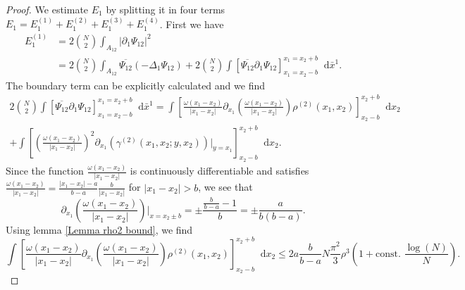 \documentclass[a4paper,11pt]{article}
\newcommand{\abs}[1]{\left\lvert #1 \right\rvert}
\newcommand*\diff{\mathop{}\!\mathrm{d}}
\numberwithin{equation}{section}
\begin{document}
		\begin{proof}
		We estimate $ E_1 $ by splitting it in four terms $ E_1=E_1^{(1)}+E_1^{(2)}+E_1^{(3)}+E_1^{(4)} $. First we have \begin{equation}
		\begin{aligned}
		E_1^{(1)}&=2\binom{N}{2}\int_{A_{12}}\abs{\partial_1\Psi_{12}}^2\\&
		=2\binom{N}{2}\int_{A_{12}}\overline{\Psi_{12}}\left( -\Delta_1 \Psi_{12} \right)+2\binom{N}{2}\int\left[\overline{\Psi_{12}}\partial_1\Psi_{12}\right]_{x_1=x_2-b}^{x_1=x_2+b}\diff \bar{x}^1.
		\end{aligned}
		\end{equation}
		The boundary term can be explicitly calculated and we find \begin{equation}
		\begin{aligned}
		2\binom{N}{2}\int\left[\overline{\Psi_{12}}\partial_1\Psi_{12}\right]_{x_1=x_2-b}^{x_1=x_2+b}\diff \bar{x}^1=\int\left[\frac{\omega(x_1-x_2)}{\abs{x_1-x_2}}\partial_{x_1}\left(\frac{\omega(x_1-x_2)}{\abs{x_1-x_2}}\right)\rho^{(2)}(x_1,x_2)\right]_{x_2-b}^{x_2+b}\diff x_2\\+\int\left[\left(\frac{\omega(x_1-x_2)}{\abs{x_1-x_2}}\right)^2\partial_{x_1}\left(\gamma^{(2)}(x_1,x_2;y,x_2)\right)\bigg\vert_{y=x_1}\right]_{x_2-b}^{x_2+b}\diff x_2.
		\end{aligned}
		\end{equation}
		Since the function $ \frac{\omega(x_1-x_2)}{\abs{x_1-x_2}} $ is continuously differentiable and satisfies $ \frac{\omega(x_1-x_2)}{\abs{x_1-x_2}}=\frac{\abs{x_1-x_2}-a}{b-a}\frac{b}{\abs{x_1-x_2}} $ for $ \abs{x_1-x_2}>b $, we see that \begin{equation}
		\partial_{x_1}\left(\frac{\omega(x_1-x_2)}{\abs{x_1-x_2}}\right)\bigg\vert_{x=x_2\pm b}=\pm \frac{\frac{b}{b-a}-1}{ b}=\pm\frac{a}{b(b-a)}.
		\end{equation}
		Using lemma \ref{Lemma rho2 bound}, we find \begin{equation}
		\int\left[\frac{\omega(x_1-x_2)}{\abs{x_1-x_2}}\partial_{x_1}\left(\frac{\omega(x_1-x_2)}{\abs{x_1-x_2}}\right)\rho^{(2)}(x_1,x_2)\right]_{x_2-b}^{x_2+b}\diff x_2\leq 2a\frac{b}{b-a} N\frac{\pi^2}{3}\rho^3\left(1+\text{const. }\frac{\log(N)}{N}\right).
		\end{equation}
		

\end{proof}
\end{document}
